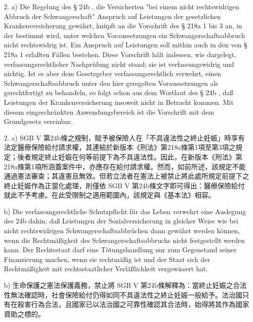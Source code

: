 \documentclass[12pt]{article}
\begin{document}
\begin{sourcepara}[title={原文E.202}]
2. a) Die Regelung des § 24b \abbrSGBV{}, die Versicherten "bei einem nicht rechtswidrigen Abbruch der Schwangerschaft" Anspruch auf Leistungen der gesetzlichen Krankenversicherung gewährt, knüpft an die Vorschrift des § 218a \abbrAbs{} 1 bis 3 \abbrStGB{} \abbrNF{} an, in der bestimmt wird, unter welchen Voraussetzungen ein Schwangerschaftsabbruch nicht rechtswidrig ist. Ein Anspruch auf Leistungen soll mithin auch in den von § 218a \abbrAbs{} 1 \abbrStGB{} \abbrNF{} erfaßten Fällen bestehen. Diese Vorschrift hält indessen, wie dargelegt, verfassungsrechtlicher Nachprüfung nicht stand; sie ist verfassungswidrig und nichtig. Ist es aber dem Gesetzgeber verfassungsrechtlich verwehrt, einen Schwangerschaftsabbruch unter den hier geregelten Voraussetzungen als gerechtfertigt zu behandeln, so folgt schon aus dem Wortlaut des § 24b \abbrSGBV{}, daß Leistungen der Krankenversicherung insoweit nicht in Betracht kommen. Mit diesem eingeschränkten Anwendungsbereich ist die Vorschrift mit dem Grundgesetz vereinbar.
\end{sourcepara}
\begin{transpara}
2. a) SGB V 第24b條之規制，賦予被保險人在「不具違法性之終止妊娠」時享有法定醫療保險給付請求權，其連結於新版本《刑法》第218a條第1項至第3項之規定；後者規定終止妊娠在何等前提下為不具違法性。因此，在新版本《刑法》第218a條第1項所涵蓋案件中，亦應存在給付請求權。然而，如前所述，該規定不能通過憲法審查；其違憲且無效。但若立法者在憲法上被禁止將此處所規定前提下之終止妊娠作為正當化處理，則僅依 SGB V 第24b條文字即可得出：醫療保險給付就此不予考慮。在此受限制之適用範圍內，該規定與《基本法》相容。
\end{transpara}

\begin{sourcepara}[title={原文E.203}]
b) Die verfassungsrechtliche Schutzpflicht für das Leben verwehrt eine Auslegung des 24b \abbrSGBV{} dahin, daß Leistungen der Sozialversicherung in gleicher Weise wie bei nicht rechtswidrigen Schwangerschaftsabbrüchen dann gewährt werden können, wenn die Rechtmäßigkeit des Schwangerschaftsabbruchs nicht festgestellt werden kann. Der Rechtsstaat darf eine Tötungshandlung nur zum Gegenstand seiner Finanzierung machen, wenn sie rechtmäßig ist und der Staat sich der Rechtmäßigkeit mit rechtsstaatlicher Verläßlichkeit vergewissert hat.
\end{sourcepara}
\begin{transpara}
b) 生命保護之憲法保護義務，禁止將 SGB V 第24b條解釋為：當終止妊娠之合法性無法確認時，社會保險給付仍得如同不具違法性之終止妊娠一般給予。法治國只有在殺害行為合法，且國家已以法治國之可靠性確認其合法時，始得將其作為國家資助之標的。
\end{transpara}
\end{document}
